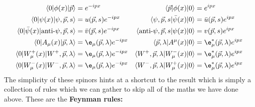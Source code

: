 \documentclass[a4paper, 11pt, normalem]{report}
\begin{document}
\begin{align}
    \langle0|\phi(x)|\vec{p}\rangle &= e^{-ipx} & \langle\vec{p}|\phi(x)|0\rangle &= e^{ipx} \\
    \langle0|\psi(x)|\psi,\vec{p},s\rangle &= u(\vec{p},s)e^{-ipx} & \langle\psi,\vec{p},s|\bar{\psi}(x)|0\rangle &= \bar{u}(\vec{p},s)e^{ipx} \\
    \langle0|\bar{\psi}(x)|\text{anti-}\psi,\vec{p},s\rangle &= \bar{v}(\vec{p},s)e^{-ipx} & \langle\text{anti-}\psi,\vec{p},s|\psi(x)|0\rangle &= v(\vec{p},s)e^{ipx} \\
    \langle0|A_\mu(x)|\vec{p},\lambda\rangle &= \e_\mu(\vec{p},\lambda)e^{-ipx} & \langle\vec{p},\lambda|A^\mu(x)|0\rangle &= \e_\mu^*(\vec{p},\lambda)e^{ipx} \\
    \langle0|W_\mu^+(x)|W^+,\vec{p},\lambda\rangle &= \e_\mu(\vec{p},\lambda)e^{-ipx} & \langle W^+,\vec{p},\lambda|W_\mu^-(x)|0\rangle &= \e_\mu^*(\vec{p},\lambda)e^{ipx} \\
    \langle0|W_\mu^-(x)|W^-,\vec{p},\lambda\rangle &= \e_\mu(\vec{p},\lambda)e^{-ipx} & \langle W^-,\vec{p},\lambda|W_\mu^+(x)|0\rangle &= \e_\mu^*(\vec{p},\lambda)e^{ipx}
\end{align}
The simplicity of these spinors hints at a shortcut to the result which is simply a collection of rules which we can gather to skip all of the maths we have done above.
These are the \textbf{Feynman rules:}
\end{document}
